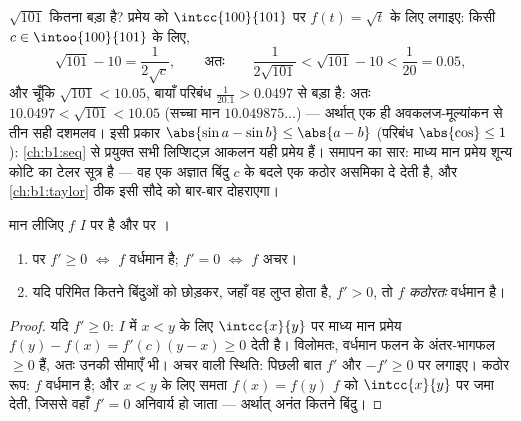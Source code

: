 \begin{example}[आकलक के रूप में माध्य मान प्रमेय]\label{ex:b1:derivative:mvtestimate}
$\sqrt{101}$ कितना बड़ा है? प्रमेय को $\intcc{100}{101}$ पर $f(t) = \sqrt t$
के लिए लगाइए: किसी $c \in \intoo{100}{101}$ के लिए,
\[
\sqrt{101} - 10 = \frac{1}{2\sqrt c},
\qquad\text{अतः}\qquad
\frac{1}{2\sqrt{101}} < \sqrt{101} - 10 < \frac{1}{20} = 0.05 ,
\]
और चूँकि $\sqrt{101} < 10.05$, बायाँ परिबंध $\frac{1}{20.1} > 0.0497$ से
बड़ा है: अतः $10.0497 < \sqrt{101} < 10.05$ (सच्चा मान $10.049875\dots$) ---
अर्थात् एक ही अवकलज-मूल्यांकन से तीन सही दशमलव। इसी प्रकार $\abs{\sin a -
\sin b} \leq \abs{a - b}$ (परिबंध $\abs{\cos}\leq 1$): \cref{ch:b1:seq} से
प्रयुक्त सभी लिप्शिट्ज़ आकलन यही प्रमेय हैं। समापन का सार: माध्य मान प्रमेय
शून्य कोटि का टेलर सूत्र है --- वह एक अज्ञात बिंदु $c$ के बदले एक कठोर
असमिका दे देती है, और \cref{ch:b1:taylor} ठीक इसी सौदे को बार-बार दोहराएगा।
\end{example}

\begin{corollary}[एकदिष्टता की कसौटी]\label{cor:b1:derivative:monotone}
मान लीजिए $f$ $I$ पर  है और  पर ।
\begin{enumerate}
  \item {} पर $f' \geq 0$ $\iff$ $f$ वर्धमान है; $f' = 0$ $\iff$ $f$
  अचर।
  \item यदि परिमित कितने बिंदुओं को छोड़कर, जहाँ वह लुप्त होता है, $f' > 0$,
  तो $f$ \emph{कठोरतः} वर्धमान है।
\end{enumerate}
\end{corollary}

\begin{proof}
यदि $f' \geq 0$: $I$ में $x < y$ के लिए $\intcc{x}{y}$ पर माध्य मान प्रमेय
$f(y) - f(x) = f'(c)(y - x) \geq 0$ देती है। विलोमतः, वर्धमान फलन के
अंतर-भागफल $\geq 0$ हैं, अतः उनकी सीमाएँ भी। अचर वाली स्थिति: पिछली बात $f'$
और $-f' \geq 0$ पर लगाइए। कठोर रूप: $f$ वर्धमान है; और $x < y$ के लिए समता
$f(x) = f(y)$ $f$ को $\intcc{x}{y}$ पर जमा देती, जिससे वहाँ $f' = 0$
अनिवार्य हो जाता --- अर्थात् अनंत कितने बिंदु।
\end{proof}

